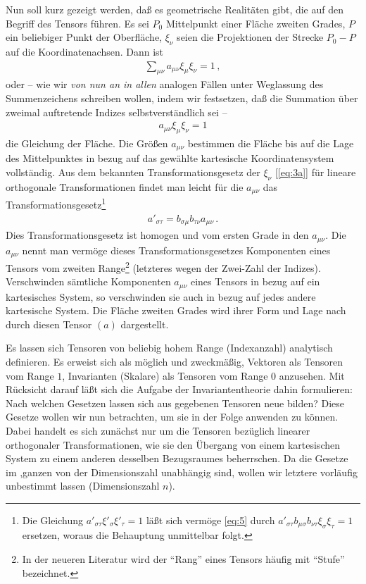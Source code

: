 Nun soll kurz gezeigt werden, daß es geometrische Realitäten gibt, die auf den 
Begriff des Tensors führen. Es sei $P_0$ Mittelpunkt einer Fläche zweiten 
Grades, $P$ ein beliebiger Punkt der Oberfläche, $\xi_{\nu}$ seien die 
Projektionen der Strecke $P_0 - P$ auf die Koordinatenachsen. Dann ist
\begin{align*}
\sum_{\mu\nu} a_{\mu\nu} \xi_{\mu} \xi_{\nu}  = 1\, ,
\end{align*}
oder -- wie wir \emph{von nun an in allen} analogen Fällen unter Weglassung des 
Summenzeichens schreiben wollen, indem wir festsetzen, daß die Summation über 
zweimal auftretende Indizes selbstverständlich sei --
\begin{align*}
a_{\mu\nu} \xi_{\mu} \xi_{\nu}  = 1
\end{align*}
die Gleichung der Fläche. Die Größen $a_{\mu\nu}$ bestimmen die Fläche bis auf 
die Lage des Mittelpunktes in bezug auf das gewählte kartesische 
Koordinatensystem vollständig. Aus dem bekannten Transformationsgesetz der 
$\xi_{\nu}$ [\cref{eq:3a}] für lineare orthogonale Transformationen findet man 
leicht für die $a_{\mu\nu}$ das Transformationsgesetz\footnote{Die Gleichung 
$a'_{\sigma\tau} \xi'_{\sigma} \xi'_{\tau} = 1$ läßt sich vermöge \eqref{eq:5} 
durch $a'_{\sigma\tau} b_{\mu\sigma} b_{\nu\tau} \xi_{\sigma} \xi_{\tau} = 1$ 
ersetzen, woraus die Behauptung unmittelbar folgt.}
\begin{align*}
a'_{\sigma\tau} = b_{\sigma\mu} b_{\tau\nu} a_{\mu\nu}\,.
\end{align*}
Dies Transformationsgesetz ist homogen und vom ersten Grade in den 
$a_{\mu\nu}$. Die $a_{\mu\nu}$ nennt man vermöge dieses Transformationsgesetzes 
Komponenten eines Tensors vom zweiten Range\footnote{In der neueren Literatur 
wird der \enquote{Rang} eines Tensors häufig mit \enquote{Stufe} bezeichnet.} 
(letzteres wegen der Zwei-Zahl der Indizes). Verschwinden sämtliche Komponenten 
$a_{\mu\nu}$ eines Tensors in bezug auf ein kartesisches System, so 
verschwinden sie auch in bezug auf jedes andere kartesische System. Die Fläche 
zweiten Grades wird ihrer Form und Lage nach durch diesen Tensor $(a)$ 
dargestellt.

Es lassen sich Tensoren von beliebig hohem Range (Indexanzahl) analytisch 
definieren. Es erweist sich als möglich und zweckmäßig, Vektoren als Tensoren 
vom Range $1$, Invarianten (Skalare) als Tensoren vom Range $0$ anzusehen. Mit 
Rücksicht darauf läßt sich die Aufgabe der Invariantentheorie dahin 
formulieren: Nach welchen Gesetzen lassen sich aus gegebenen Tensoren neue 
bilden? Diese Gesetze wollen wir nun betrachten, um sie in der Folge anwenden zu 
können. Dabei handelt es sich zunächst nur um die Tensoren bezüglich linearer 
orthogonaler Transformationen, wie sie den Übergang von einem kartesischen 
System zu einem anderen desselben Bezugsraumes beherrschen. Da die Gesetze im 
,ganzen von der Dimensionszahl unabhängig sind, wollen wir letztere vorläufig 
unbestimmt lassen (Dimensionszahl $n$).

